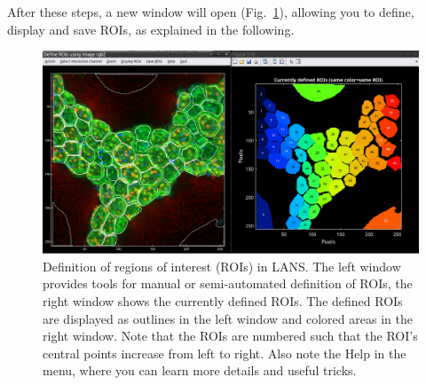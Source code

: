 \goldbox{}
After these steps, a new window will open (Fig.~\ref{fig:roi-definition-tool}), allowing you to define, display and save ROIs, as explained in the following.
\tcbe

\begin{figure}[!ht]
\centering
\includegraphics[width=\textwidth]{figs3/LANS-roi-definition-tool}
\caption{\label{fig:roi-definition-tool}%
Definition of regions of interest (ROIs) in LANS. The left window provides tools for manual or semi-automated definition of ROIs, the right window shows the currently defined ROIs. The defined ROIs are displayed as outlines in the left window and colored areas in the right window. Note that the ROIs are numbered such that the ROI's central points increase from left to right. Also note the Help in the menu, where you can learn more details and useful tricks.}
\end{figure}

\setcounter{step}{0}






